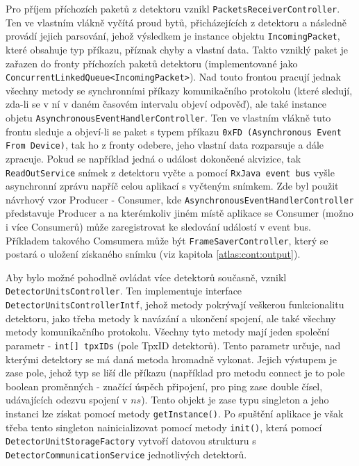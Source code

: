 Pro příjem příchozích paketů z detektoru vznikl \texttt{PacketsReceiverController}. Ten ve vlastním vlákně vyčítá proud bytů, přicházejících z detektoru a následně provádí jejich parsování, jehož výsledkem je instance objektu \texttt{IncomingPacket}, které obsahuje typ příkazu, příznak chyby a vlastní data. Takto vzniklý paket je zařazen do fronty příchozích paketů detektoru (implementované jako \texttt{ConcurrentLinkedQueue<IncomingPacket>}). Nad touto frontou pracují jednak všechny metody se synchronními příkazy komunikačního protokolu (které sledují, zda-li se v ní v daném časovém intervalu objeví odpověď), ale také instance objetu \texttt{AsynchronousEventHandlerController}. Ten ve vlastním vlákně tuto frontu sleduje a objeví-li se paket s typem příkazu \texttt{0xFD (Asynchronous Event From Device)}, tak ho z fronty odebere, jeho vlastní data rozparsuje a dále zpracuje. Pokud se například jedná o událost dokončené akvizice, tak \texttt{ReadOutService} snímek z detektoru vyčte a pomocí \texttt{RxJava event bus} vyšle asynchronní zprávu napříč celou aplikací s vyčteným snímkem. Zde byl použit návrhový vzor Producer - Consumer, kde \texttt{AsynchronousEventHandlerController} představuje Producer a na kterémkoliv jiném místě aplikace se Consumer (možno i více Consumerů) může zaregistrovat ke sledování událostí v event bus. Příkladem takového Comsumera může být \texttt{FrameSaverController}, který se postará o uložení získaného snímku (viz kapitola \ref{atlas:cont:output}).

Aby bylo možné pohodlně ovládat více detektorů současně, vznikl\\\texttt{DetectorUnitsController}. Ten implementuje interface \texttt{DetectorUnitsControllerIntf}, jehož metody pokrývají veškerou funkcionalitu detektoru, jako třeba metody k navázání a ukončení spojení, ale také všechny metody komunikačního protokolu. Všechny tyto metody mají jeden společní parametr - \texttt{int[] tpxIDs} (pole TpxID detektorů). Tento parametr určuje, nad kterými detektory se má daná metoda hromadně vykonat. Jejich výstupem je zase pole, jehož typ se liší dle příkazu (například pro metodu connect je to pole boolean proměnných - značící úspěch připojení, pro ping zase double čísel, udávajících odezvu spojení v $ns$). Tento objekt je zase typu singleton a jeho instanci lze získat pomocí metody \texttt{getInstance()}. Po spuštění aplikace je však třeba tento singleton nainicializovat pomocí metody \texttt{init()}, která pomocí \texttt{DetectorUnitStorageFactory} vytvoří datovou strukturu  s \texttt{DetectorCommunicationService} jednotlivých detektorů.



